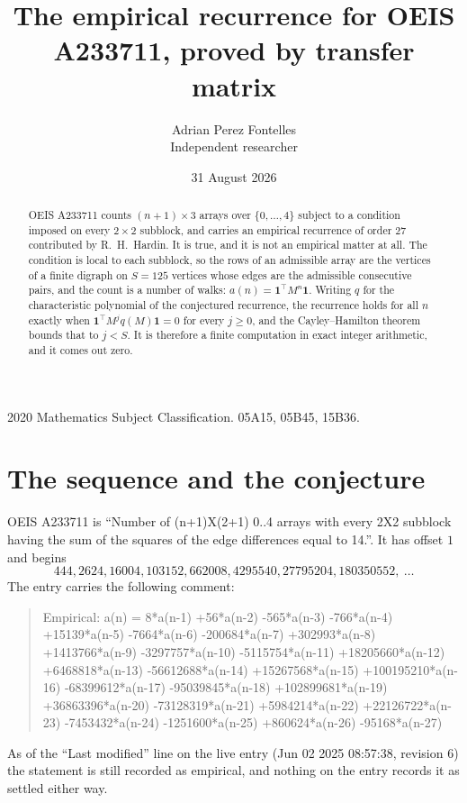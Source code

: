 \documentclass[11pt,a4paper]{article}
\title{The empirical recurrence for OEIS A233711, proved by transfer matrix}
\author{Adrian Perez Fontelles\\ \small Independent researcher}
\date{31 August 2026}
\theoremstyle{plain}
\theoremstyle{definition}
\begin{document}
\maketitle

\begin{abstract}
OEIS A233711 counts $(n+1)\times3$ arrays over $\{0,\dots,4\}$ subject to a condition imposed on
every $2\times2$ subblock, and carries an empirical recurrence of order $27$ contributed
by R.~H.~Hardin. It is true, and it is not an empirical matter at all. The condition is local
to each subblock, so the rows of an admissible array are the vertices of a finite digraph
on $S=125$ vertices whose edges are the admissible consecutive pairs, and the count is a
number of walks: $a(n)=\mathbf{1}^{\!\top}M^{n}\mathbf{1}$. Writing $q$
for the characteristic polynomial of the conjectured recurrence, the recurrence holds for all
$n$ exactly when $\mathbf{1}^{\!\top}M^{j}q(M)\mathbf{1}=0$ for every $j\ge0$, and the
Cayley--Hamilton theorem bounds that to $j<S$. It is therefore a finite computation in exact
integer arithmetic, and it comes out zero.
\end{abstract}

\noindent\small 2020 Mathematics Subject Classification. 05A15, 05B45, 15B36.\normalsize

\section{The sequence and the conjecture}

OEIS A233711 is ``Number of (n+1)X(2+1) 0..4 arrays with every 2X2 subblock having the sum of the squares of the edge differences equal to 14.''. It has offset $1$ and begins
\[
444, 2624, 16004, 103152, 662008, 4295540, 27795204, 180350552,\ \dots
\]
The entry carries the following comment:
\begin{quote}\small
Empirical: a(n) = 8*a(n-1) +56*a(n-2) -565*a(n-3) -766*a(n-4) +15139*a(n-5) -7664*a(n-6) -200684*a(n-7) +302993*a(n-8) +1413766*a(n-9) -3297757*a(n-10) -5115754*a(n-11) +18205660*a(n-12) +6468818*a(n-13) -56612688*a(n-14) +15267568*a(n-15) +100195210*a(n-16) -68399612*a(n-17) -95039845*a(n-18) +102899681*a(n-19) +36863396*a(n-20) -73128319*a(n-21) +5984214*a(n-22) +22126722*a(n-23) -7453432*a(n-24) -1251600*a(n-25) +860624*a(n-26) -95168*a(n-27)
\end{quote}
As of the ``Last modified'' line on the live entry (Jun 02 2025 08:57:38, revision 6) the statement is
still recorded as empirical, and nothing on the entry records it as settled either way.
\end{document}
